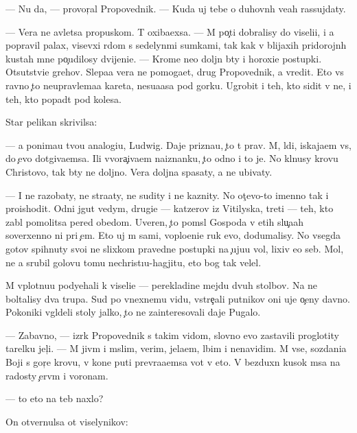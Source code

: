 \documentclass[10pt]{book}
\begin{document}
— Nu da, — provor{\c}al Propovednik. — Kuda uj tebe o duhovn{\yi}h ve{\x}ah rassujdaty.

— Vera ne {\y}avl{\ia}{\y}etsa propuskom. T{\yi} oxiba{\y}exsa. — M{\yi} po{\c}ti dobralisy do viseli{\q}i, i {\y}a popravil palax, visevxi{\y} r{\ia}dom s sedelyn{\yi}mi sumkami, tak kak v blija{\y}xih pridorojn{\yi}h kustah mne po{\c}udilosy dvijeni{\y}e. — Krome ne{\y}o doljn{\yi} b{\yi}ty i horoxi{\y}e postupki. Otsutstvi{\y}e grehov. Slepa{\y}a vera ne pomoga{\y}et, drug Propovednik, a vredit. Eto vs{\e} ravno {\c}to neupravl{\ia}{\y}ema{\y}a kareta, nesu{\x}a{\y}asa pod gorku. Ugrobit i teh, kto sidit v ne{\y}, i teh, kto popad{\e}t pod kolesa.

Star{\yi}{\y} pelikan skrivilsa:

— {\Y}a ponima{\y}u tvo{\y}u analogi{\y}u, Ludwig. Daje prizna{\y}u, {\c}to t{\yi} prav. M{\yi}, l{\iu}di, iskaja{\y}em vs{\e}, do {\c}evo dot{\ia}giva{\y}emsa. Ili v{\yi}vora{\c}iva{\y}em naiznanku, {\c}to odno i to je. No kl{\ia}nusy krov{\y}u Christovo{\y}, tak b{\yi}ty ne doljno. Vera doljna spasaty, a ne ubivaty.

— I ne razob{\x}aty, ne stra{\x}aty, ne sudity i ne kaznity. No ot{\c}evo-to imenno tak i proishodit. Odni jgut vedym, drugi{\y}e — katzerov iz Vitilyska, tret{\yf}i — teh, kto zab{\yi}l pomolitsa pered obedom. Uveren, {\c}to pom{\yi}sl{\yi} Gospoda v etih slu{\c}a{\y}ah soverxenno ni pri {\c}em. Eto uj m{\yi} sami, voplo{\x}eni{\y}e ruk {\y}evo, dodumalisy. No vsegda gotov{\yi} spihnuty svo{\y}i ne slixkom pravedn{\yi}{\y}e postupki na {\c}uju{\y}u vol{\iu}, lixiv {\y}e{\y}o seb{\ia}. Mol, ne {\y}a srubil golovu tomu nechrist{\i}u-hagjitu, eto bog tak velel.

M{\yi} vplotnu{\y}u podyehali k viseli{\q}e — perekladine mejdu dvuh stolbov. Na ne{\y} boltalisy dva trupa. Sud{\ia} po vnexnemu vidu, vstre{\c}ali putnikov oni uje o{\c}eny davno. Poko{\y}niki v{\yi}gl{\ia}deli stoly jalko, {\c}to ne zainteresovali daje Pugalo.

— Zabavno, — izr{\e}k Propovednik s takim vidom, slovno {\y}evo zastavili proglotity tarelku jel{\c}i. — M{\yi} jiv{\e}m i m{\yi}slim, verim, jela{\y}em, l{\iu}bim i nenavidim. M{\yi} vse, sozdani{\y}a Boj{\yf}i s gor{\ia}{\c}e{\y} krov{\y}u, v kon{\q}e puti prevra{\x}a{\y}emsa vot v eto. V bezduxn{\yi}{\y} kusok m{\ia}sa na radosty {\c}erv{\ia}m i voronam.

— {\C}to eto na teb{\ia} naxlo?

On otvernulsa ot viselynikov:
\end{document}
